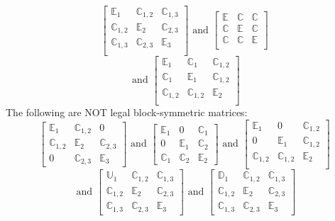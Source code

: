 \documentclass[]{article}
\begin{document}
\begin{equation*}
\begin{bmatrix}
\mathbb{E}_1&\mathbb{C}_{1,2}&\mathbb{C}_{1,3}\\
\mathbb{C}_{1,2}&\mathbb{E}_2&\mathbb{C}_{2,3}\\
\mathbb{C}_{1,3}&\mathbb{C}_{2,3}&\mathbb{E}_3\\
\end{bmatrix}
\text{ and }
\begin{bmatrix}
\mathbb{E}&\mathbb{C}&\mathbb{C}\\
\mathbb{C}&\mathbb{E}&\mathbb{C}\\
\mathbb{C}&\mathbb{C}&\mathbb{E}\\
\end{bmatrix}
\end{equation*}
\begin{equation*}
\text{ and }
\begin{bmatrix}
\mathbb{E}_1&\mathbb{C}_1&\mathbb{C}_{1,2}\\
\mathbb{C}_1&\mathbb{E}_1&\mathbb{C}_{1,2}\\
\mathbb{C}_{1,2}&\mathbb{C}_{1,2}&\mathbb{E}_2\\
\end{bmatrix}
\end{equation*}
The following are NOT legal block-symmetric matrices:
\begin{equation*}
\begin{bmatrix}
\mathbb{E}_1&\mathbb{C}_{1,2}&0\\
\mathbb{C}_{1,2}&\mathbb{E}_2&\mathbb{C}_{2,3}\\
0&\mathbb{C}_{2,3}&\mathbb{E}_3
\end{bmatrix}
\text{ and }
\begin{bmatrix}
\mathbb{E}_1&0&\mathbb{C}_1\\
0&\mathbb{E}_1&\mathbb{C}_2\\
\mathbb{C}_1&\mathbb{C}_2&\mathbb{E}_2
\end{bmatrix}
\text{ and }
\begin{bmatrix}
\mathbb{E}_1&0&\mathbb{C}_{1,2}\\
0&\mathbb{E}_1&\mathbb{C}_{1,2}\\
\mathbb{C}_{1,2}&\mathbb{C}_{1,2}&\mathbb{E}_2\\
\end{bmatrix}
\end{equation*}
\begin{equation*}
\text{ and }
\begin{bmatrix}
\mathbb{U}_1&\mathbb{C}_{1,2}&\mathbb{C}_{1,3}\\
\mathbb{C}_{1,2}&\mathbb{E}_2&\mathbb{C}_{2,3}\\
\mathbb{C}_{1,3}&\mathbb{C}_{2,3}&\mathbb{E}_3
\end{bmatrix}
\text{ and }
\begin{bmatrix}
\mathbb{D}_1&\mathbb{C}_{1,2}&\mathbb{C}_{1,3}\\
\mathbb{C}_{1,2}&\mathbb{E}_2&\mathbb{C}_{2,3}\\
\mathbb{C}_{1,3}&\mathbb{C}_{2,3}&\mathbb{E}_3\end{bmatrix}
\end{equation*}
\end{document}
